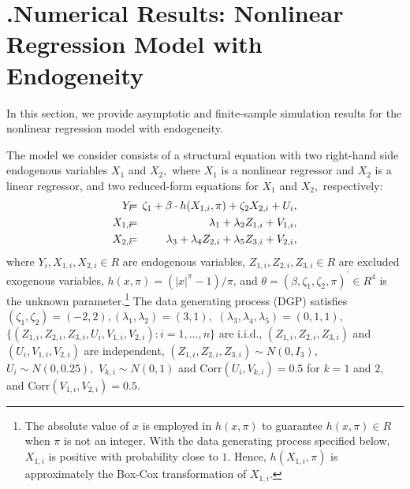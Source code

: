 \documentclass[12pt,thmsb,titlepage,final,oneside,letterpaper]{article}
\begin{document}
\section{ \hspace{-0.34in}\textbf{.}\hspace{0.2in}Numerical Results:
Nonlinear Regression Model with Endogeneity\label{Numerical Results Sec}}

\hspace{0.25in}\setcounter{equation}{0}In this section, we provide
asymptotic and finite-sample simulation results for the nonlinear regression
model with endogeneity.

The model we consider consists of a structural equation with two right-hand
side endogenous variables $X_{1}$ and $X_{2},$ where $X_{1}$ is a nonlinear
regressor and $X_{2}$ is a linear regressor, and two reduced-form equations
for $X_{1}$ and $X_{2},$ respectively:%
\begin{eqnarray}
Y_{i}\hspace{-0.08in} &=&\hspace{-0.08in}\zeta _{1}+\beta \cdot
h(X_{1,i},\pi )+\zeta _{2}X_{2,i}+U_{i},  \notag \\
X_{1,i}\hspace{-0.08in} &=&\hspace{-0.08in}\lambda _{1}+\lambda
_{2}Z_{1,i}+V_{1,i},  \notag \\
X_{2,i}\hspace{-0.08in} &=&\hspace{-0.08in}\lambda _{3}+\lambda
_{4}Z_{2,i}+\lambda _{5}Z_{3,i}+V_{2,i},
\end{eqnarray}%
where $Y_{i},X_{1,i},X_{2,i}\in R$ are endogenous variables, $%
Z_{1,i},Z_{2,i},Z_{3,i}\in R$ are excluded exogenous variables, $h(x,\pi
)=(|x|^{\pi }-1)/\pi $, and $\theta =(\beta ,\zeta _{1},\zeta _{2},\pi
)^{\prime }\in R^{4}$ is the unknown parameter.\footnote{%
The absolute value of $x$ is employed in $h(x,\pi )$ to guarantee $h(x,\pi
)\in R$ when $\pi $ is not an integer. With the data generating process
specified below, $X_{1,i}$ is positive with probability close to $1.$ Hence, 
$h(X_{1,i},\pi )$ is approximately the Box-Cox transformation of $X_{1,i}.$}
The data generating process (DGP) satisfies $(\zeta _{1},\zeta
_{2})=(-2,2),(\lambda _{1},\lambda _{2})=(3,1),$ $(\lambda _{3},\lambda
_{4},\lambda _{5})=(0,1,1),$ $%
\{(Z_{1,i},Z_{2,i},Z_{3,i},U_{i},V_{1,i},V_{2,i}):i=1,...,n\}$ are i.i.d., $%
(Z_{1,i},Z_{2,i},Z_{3,i})$ and $(U_{i},V_{1,i},V_{2,i})$ are independent, $%
(Z_{1,i},Z_{2,i},Z_{3,i})\sim N(0,I_{3}),$ $U_{i}\sim N(0,0.25),$ $%
V_{k,i}\sim N(0,1)$ and $\mathrm{Corr}(U_{i},V_{k,i})=0.5$ for $k=1$ and $2,$
and $\mathrm{Corr}(V_{1,i},V_{2,i})=0.5.$
\end{document}
